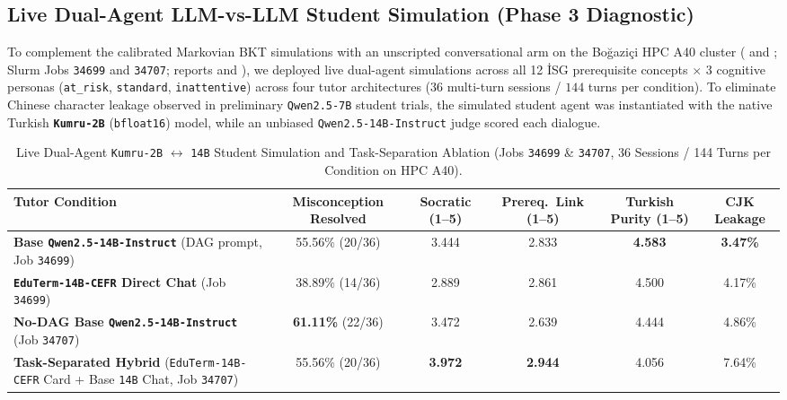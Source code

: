 \documentclass[a4paper,12pt]{report}
\begin{document}
\subsection{Live Dual-Agent LLM-vs-LLM Student Simulation (Phase 3 Diagnostic)}
\label{sec:live_llm_student_sim}

To complement the calibrated Markovian BKT simulations with an unscripted conversational arm on the Bo\u{g}azi\c{c}i HPC A40 cluster ( and ; Slurm Jobs \texttt{34699} and \texttt{34707}; reports  and ), we deployed live dual-agent simulations across all 12 \.{I}SG prerequisite concepts $\times$ 3 cognitive personas (\texttt{at\_risk}, \texttt{standard}, \texttt{inattentive}) across four tutor architectures ($36$ multi-turn sessions / $144$ turns per condition). To eliminate Chinese character leakage observed in preliminary \texttt{Qwen2.5-7B} student trials, the simulated student agent was instantiated with the native Turkish \textbf{\texttt{Kumru-2B}} (\texttt{bfloat16}) model, while an unbiased \texttt{Qwen2.5-14B-Instruct} judge scored each dialogue.

\begin{table}[htbp]
\centering
\small
\caption{Live Dual-Agent \texttt{Kumru-2B} $\leftrightarrow$ \texttt{14B} Student Simulation and Task-Separation Ablation (Jobs \texttt{34699} \& \texttt{34707}, 36 Sessions / 144 Turns per Condition on HPC A40).}
\label{tab:live_llm_student_sim}
\scriptsize\setlength{\tabcolsep}{3.5pt}
\begin{tabularx}{\textwidth}{>{\RaggedRight\arraybackslash}Xccccc}
\toprule
\textbf{Tutor Condition} & \textbf{Misconception Resolved} & \textbf{Socratic (1--5)} & \textbf{Prereq.\ Link (1--5)} & \textbf{Turkish Purity (1--5)} & \textbf{CJK Leakage} \\
\midrule
\textbf{Base \texttt{Qwen2.5-14B-Instruct}} (DAG prompt, Job \texttt{34699}) & 55.56\% (20/36) & 3.444 & 2.833 & \textbf{4.583} & \textbf{3.47\%} \\
\textbf{\texttt{EduTerm-14B-CEFR} Direct Chat} (Job \texttt{34699}) & 38.89\% (14/36) & 2.889 & 2.861 & 4.500 & 4.17\% \\
\textbf{No-DAG Base \texttt{Qwen2.5-14B-Instruct}} (Job \texttt{34707}) & \textbf{61.11\%} (22/36) & 3.472 & 2.639 & 4.444 & 4.86\% \\
\textbf{Task-Separated Hybrid} (\texttt{EduTerm-14B-CEFR} Card + Base \texttt{14B} Chat, Job \texttt{34707}) & 55.56\% (20/36) & \textbf{3.972} & \textbf{2.944} & 4.056 & 7.64\% \\
\bottomrule
\end{tabularx}
\end{table}
\end{document}

